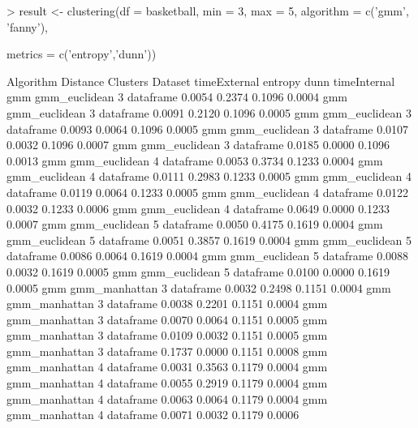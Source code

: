 \begin{Schunk}
\begin{Sinput}
> result <- clustering(df = basketball, min = 3, max = 5, algorithm = c('gmm', 'fanny'),
\end{Sinput}
\begin{Sinput}
metrics = c('entropy','dunn'))
\end{Sinput}
\begin{Soutput}
Algorithm    Distance     Clusters   Dataset   timeExternal entropy   dunn  timeInternal
     gmm   gmm_euclidean    3       dataframe    0.0054      0.2374  0.1096    0.0004
     gmm   gmm_euclidean    3       dataframe    0.0091      0.2120  0.1096    0.0005
     gmm   gmm_euclidean    3       dataframe    0.0093      0.0064  0.1096    0.0005
     gmm   gmm_euclidean    3       dataframe    0.0107      0.0032  0.1096    0.0007
     gmm   gmm_euclidean    3       dataframe    0.0185      0.0000  0.1096    0.0013
     gmm   gmm_euclidean    4       dataframe    0.0053      0.3734  0.1233    0.0004
     gmm   gmm_euclidean    4       dataframe    0.0111      0.2983  0.1233    0.0005
     gmm   gmm_euclidean    4       dataframe    0.0119      0.0064  0.1233    0.0005
     gmm   gmm_euclidean    4       dataframe    0.0122      0.0032  0.1233    0.0006
     gmm   gmm_euclidean    4       dataframe    0.0649      0.0000  0.1233    0.0007
     gmm   gmm_euclidean    5       dataframe    0.0050      0.4175  0.1619    0.0004
     gmm   gmm_euclidean    5       dataframe    0.0051      0.3857  0.1619    0.0004
     gmm   gmm_euclidean    5       dataframe    0.0086      0.0064  0.1619    0.0004
     gmm   gmm_euclidean    5       dataframe    0.0088      0.0032  0.1619    0.0005
     gmm   gmm_euclidean    5       dataframe    0.0100      0.0000  0.1619    0.0005
     gmm   gmm_manhattan    3       dataframe    0.0032      0.2498  0.1151    0.0004
     gmm   gmm_manhattan    3       dataframe    0.0038      0.2201  0.1151    0.0004
     gmm   gmm_manhattan    3       dataframe    0.0070      0.0064  0.1151    0.0005
     gmm   gmm_manhattan    3       dataframe    0.0109      0.0032  0.1151    0.0005
     gmm   gmm_manhattan    3       dataframe    0.1737      0.0000  0.1151    0.0008
     gmm   gmm_manhattan    4       dataframe    0.0031      0.3563  0.1179    0.0004
     gmm   gmm_manhattan    4       dataframe    0.0055      0.2919  0.1179    0.0004
     gmm   gmm_manhattan    4       dataframe    0.0063      0.0064  0.1179    0.0004
     gmm   gmm_manhattan    4       dataframe    0.0071      0.0032  0.1179    0.0006

\end{Soutput}
\end{Schunk}
